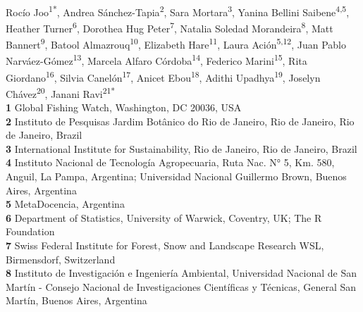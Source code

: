 \documentclass[10pt,letterpaper]{article}
\begin{document}
\vspace*{0.2in}

\begin{flushleft}
{\Large
\textbf{} %
}
\newline
\\
Rocío Joo\textsuperscript{1*\Yinyang}, 
Andrea Sánchez-Tapia\textsuperscript{2\Yinyang},
Sara Mortara\textsuperscript{3},
Yanina Bellini Saibene\textsuperscript{4,5},
Heather Turner\textsuperscript{6}, %
Dorothea Hug Peter\textsuperscript{7}, %
Natalia Soledad Morandeira\textsuperscript{8},
Matt Bannert\textsuperscript{9},
Batool Almazrouq\textsuperscript{10},
Elizabeth Hare\textsuperscript{11},
Laura Ación\textsuperscript{5,12},
Juan Pablo Narváez-Gómez\textsuperscript{13},
Marcela Alfaro Córdoba\textsuperscript{14},
Federico Marini\textsuperscript{15},
Rita Giordano\textsuperscript{16},
Silvia Canelón\textsuperscript{17},
Anicet Ebou\textsuperscript{18},
Adithi Upadhya\textsuperscript{19},
Joselyn Chávez\textsuperscript{20},
Janani Ravi\textsuperscript{21*}
\\
\bigskip
\textbf{1} Global Fishing Watch, Washington, DC 20036, USA
\\
\textbf{2} Instituto de Pesquisas Jardim Botânico do Rio de Janeiro, Rio de Janeiro, Rio de Janeiro, Brazil
\\
\textbf{3} International Institute for Sustainability, Rio de Janeiro, Rio de Janeiro, Brazil
\\
\textbf{4} Instituto Nacional de Tecnología Agropecuaria, Ruta Nac. N° 5, Km. 580, Anguil, La Pampa, Argentina; Universidad Nacional Guillermo Brown, Buenos Aires, Argentina
\\
\textbf{5} MetaDocencia, Argentina
\\
\textbf{6} Department of Statistics, University of Warwick, Coventry, UK; The R Foundation
\\
\textbf{7} Swiss Federal Institute for Forest, Snow and Landscape Research WSL, Birmensdorf, Switzerland
\\
\textbf{8} Instituto de Investigación e Ingeniería Ambiental, Universidad Nacional de San Martín - Consejo Nacional de Investigaciones Científicas y Técnicas, General San Martín, Buenos Aires, Argentina

\end{flushleft}
\end{document}
